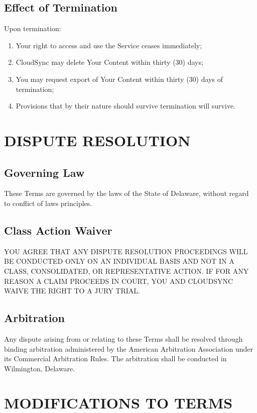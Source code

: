 \documentclass[
    language=english,
    doctype=terms-of-service,
    institution=none,
]{../../omnilatex}
\begin{document}
\subsection{Effect of Termination}
Upon termination:
\begin{enumerate}[label=(\alph*)]
    \item Your right to access and use the Service ceases immediately;
    \item CloudSync may delete Your Content within thirty (30) days;
    \item You may request export of Your Content within thirty (30) days of termination;
    \item Provisions that by their nature should survive termination will survive.
\end{enumerate}

\section{DISPUTE RESOLUTION}

\subsection{Governing Law}
These Terms are governed by the laws of the State of Delaware, without regard to conflict of laws principles.

\subsection{Class Action Waiver}
YOU AGREE THAT ANY DISPUTE RESOLUTION PROCEEDINGS WILL BE CONDUCTED ONLY ON AN INDIVIDUAL BASIS AND NOT IN A CLASS, CONSOLIDATED, OR REPRESENTATIVE ACTION. IF FOR ANY REASON A CLAIM PROCEEDS IN COURT, YOU AND CLOUDSYNC WAIVE THE RIGHT TO A JURY TRIAL.

\subsection{Arbitration}
Any dispute arising from or relating to these Terms shall be resolved through binding arbitration administered by the American Arbitration Association under its Commercial Arbitration Rules. The arbitration shall be conducted in Wilmington, Delaware.

\section{MODIFICATIONS TO TERMS}
\end{document}
